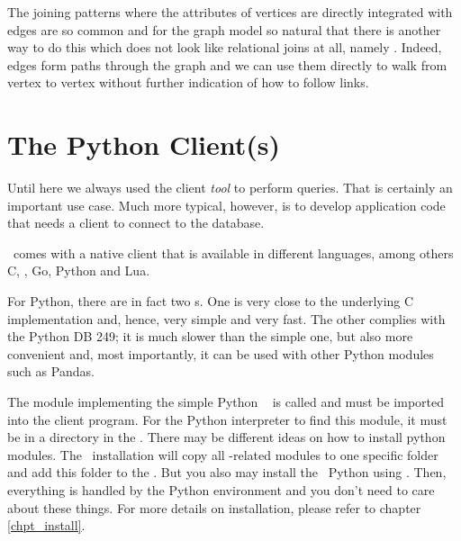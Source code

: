 The joining patterns where the attributes of vertices
are directly integrated with edges are so common
and for the graph model so natural that there is
another way to do this which does not look like
relational joins at all, namely .
Indeed, edges form paths through the graph
and we can use them directly to walk from
vertex to vertex without further indication
of how to follow links.




\section{The Python Client(s)}
Until here we always used the client \emph{tool}
to perform queries.
That is certainly an important use case.
Much more typical, however, is to develop application code
that needs a client  to connect to the database.

\nowdb\ comes with a native client 
that is available in different languages, among others
C, \CC, Go, Python and Lua.

For Python, there are in fact
two s. One is very close to the underlying
C implementation and, hence, very simple and very fast.
The other complies with the Python DB 
 249; it is much slower than the simple
one, but also more convenient and, most importantly,
it can be used with other Python modules such as Pandas.

The module implementing the simple Python \nowdb\ 
is called  and must be imported into the client program.
For the Python interpreter to find this module,
it must be in a directory in the .
There may be different ideas on how to install python modules.
The \nowdb\ installation will copy all \nowdb-related modules
to one specific folder and add this folder to the
. But you also may install
the \nowdb\ Python  using .
Then, everything is handled by the Python environment
and you don't need to care about these things.
For more details on installation, please refer
to chapter \ref{chpt_install}.

